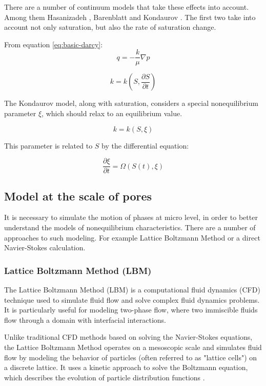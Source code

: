 	There are a number of continuum models that take these effects into account. Among them Hasanizadeh \cite{hassanizadeh2004continuum} \cite{hassanizadeh1987high}, Barenblatt \cite{barenblatt1960basic} and Kondaurov \cite{kondaurov2009non}. The first two take into account not only saturation, but also the rate of saturation change.
	
	From equation \ref{eq:basic-darcy}:
	\[ q = -\frac{k}{\mu} \nabla p \]
	
	\begin{equation}
		k = k(S, \frac{\partial S}{\partial t})
	\end{equation}
	
	The Kondaurov model, along with saturation, considers a special nonequilibrium parameter $\xi$, which should relax to an equilibrium value. \cite{kondaurov2007thermodynamically}
	
	\begin{equation}
		k = k(S, \xi)
	\end{equation}
	
	This parameter is related to $S$ by the differential equation:
	
	\begin{equation}
		\frac{\partial \xi}{\partial t} = \Omega ( S(t), \xi )
	\end{equation}

\subsection{Model at the scale of pores}
	It is necessary to simulate the motion of phases at micro level, in order to better understand the models of nonequilibrium characteristics. There are a number of approaches to such modeling. For example Lattice Boltzmann Method or a direct Navier-Stokes calculation.
		
	\subsubsection{Lattice Boltzmann Method (LBM)}
		The Lattice Boltzmann Method (LBM) is a computational fluid dynamics (CFD) technique used to simulate fluid flow and solve complex fluid dynamics problems. It is particularly useful for modeling two-phase flow, where two immiscible fluids flow through a domain with interfacial interactions.
		
		Unlike traditional CFD methods based on solving the Navier-Stokes equations, the Lattice Boltzmann Method operates on a mesoscopic scale and simulates fluid flow by modeling the behavior of particles (often referred to as "lattice cells") on a discrete lattice. It uses a kinetic approach to solve the Boltzmann equation, which describes the evolution of particle distribution functions \cite{aidun2010lattice}.
		

